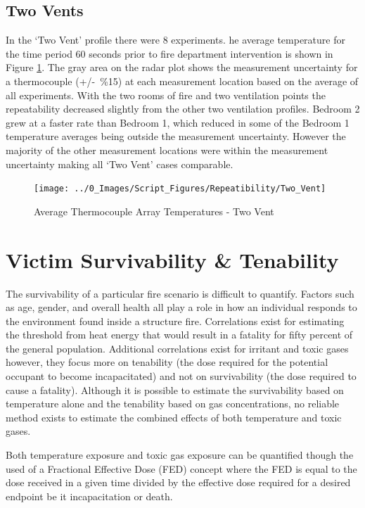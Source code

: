 \documentclass[12pt,oneside]{book}
\begin{document}
\subsection{Two Vents}
In the `Two Vent' profile there were 8 experiments. he average temperature for the time period 60 seconds prior to fire department intervention is shown in Figure \ref{fig:repeat_Two_Vent}. The gray area on the radar plot shows the measurement uncertainty for a thermocouple (+/-~\%15) at each measurement location based on the average of all experiments. With the two rooms of fire and two ventilation points the repeatability decreased slightly from the other two ventilation profiles. Bedroom 2 grew at a faster rate than Bedroom 1, which reduced in some of the Bedroom 1 temperature averages being outside the measurement uncertainty. However the majority of the other measurement locations were within the measurement uncertainty making all `Two Vent' cases comparable. 

\begin{figure}[H]
\centering
\texttt{[image: ../0\_Images/Script\_Figures/Repeatibility/Two\_Vent]}
\caption{Average Thermocouple Array Temperatures - Two Vent}
\label{fig:repeat_Two_Vent}
\end{figure}

\section{Victim Survivability \& Tenability}
The survivability of a particular fire scenario is difficult to quantify. Factors such as age, gender, and overall health all play a role in how an individual responds to the environment found inside a structure fire. Correlations exist for estimating the threshold from heat energy that would result in a fatality for fifty percent of the general population. Additional correlations exist for irritant and toxic gases however, they focus more on tenability (the dose required for the potential occupant to become incapacitated) and not on survivability (the dose required to cause a fatality). Although it is possible to estimate the survivability based on temperature alone and the tenability based on gas concentrations, no reliable method exists to estimate the combined effects of both temperature and toxic gases. \cite{SFPE:Purser}

Both temperature exposure and toxic gas exposure can be quantified though the used of a Fractional Effective Dose (FED) concept where the FED is equal to the dose received in a given time divided by the effective dose required for a desired endpoint be it incapacitation or death. 
\end{document}
